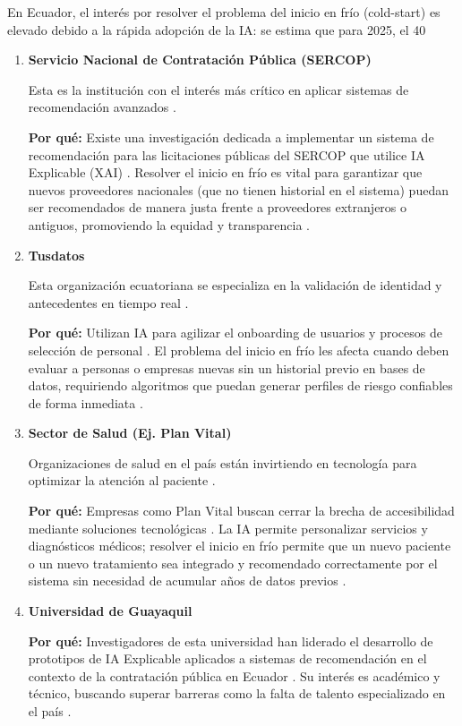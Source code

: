 \documentclass[12pt]{article}
\begin{document}
En Ecuador, el interés por resolver el problema del inicio en frío (cold-start) es elevado debido a la rápida adopción de la IA: se estima que para 2025, el 40%

\begin{enumerate}
\item \textbf{Servicio Nacional de Contratación Pública (SERCOP)}

Esta es la institución con el interés más crítico en aplicar sistemas de recomendación avanzados \cite{ia-explicable}.

\textbf{Por qué:} Existe una investigación dedicada a implementar un sistema de recomendación para las licitaciones públicas del SERCOP que utilice IA Explicable (XAI) \cite{ia-explicable}. Resolver el inicio en frío es vital para garantizar que nuevos proveedores nacionales (que no tienen historial en el sistema) puedan ser recomendados de manera justa frente a proveedores extranjeros o antiguos, promoviendo la equidad y transparencia \cite{ia-explicable}.

\item \textbf{Tusdatos}

Esta organización ecuatoriana se especializa en la validación de identidad y antecedentes en tiempo real \cite{tudatos-ecuador-ia}.

\textbf{Por qué:} Utilizan IA para agilizar el onboarding de usuarios y procesos de selección de personal \cite{tudatos-ecuador-ia}. El problema del inicio en frío les afecta cuando deben evaluar a personas o empresas nuevas sin un historial previo en bases de datos, requiriendo algoritmos que puedan generar perfiles de riesgo confiables de forma inmediata \cite{tudatos-ecuador-ia}.

\item \textbf{Sector de Salud (Ej. Plan Vital)}

Organizaciones de salud en el país están invirtiendo en tecnología para optimizar la atención al paciente \cite{ekos-empresas-ia}.

\textbf{Por qué:} Empresas como Plan Vital buscan cerrar la brecha de accesibilidad mediante soluciones tecnológicas \cite{ekos-empresas-ia}. La IA permite personalizar servicios y diagnósticos médicos; resolver el inicio en frío permite que un nuevo paciente o un nuevo tratamiento sea integrado y recomendado correctamente por el sistema sin necesidad de acumular años de datos previos \cite{ekos-empresas-ia}.

\item \textbf{Universidad de Guayaquil}

\textbf{Por qué:} Investigadores de esta universidad han liderado el desarrollo de prototipos de IA Explicable aplicados a sistemas de recomendación en el contexto de la contratación pública en Ecuador \cite{ia-explicable}. Su interés es académico y técnico, buscando superar barreras como la falta de talento especializado en el país \cite{tudatos-ecuador-ia, ia-explicable}.
\end{enumerate}
\end{document}
